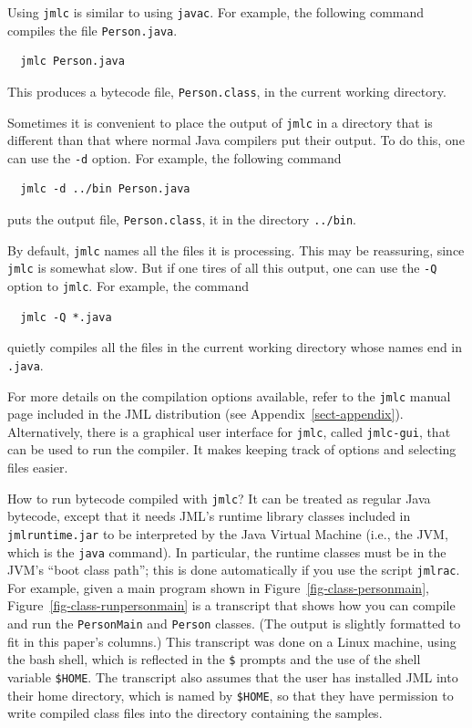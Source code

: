 \documentclass[twocolumn]{article}
\begin{document}
Using \texttt{jmlc} is similar to using \texttt{javac}.
For example, the following command compiles the file \texttt{Person.java}.
\begin{verbatim}
  jmlc Person.java
\end{verbatim}
This produces a bytecode file, \texttt{Person.class},
in the current working directory.

Sometimes it is convenient to place the output of \texttt{jmlc} in a
directory that is different than that where normal Java compilers put
their output.  To do this, one can use the \texttt{-d} option.
For example, the following command
\begin{verbatim}
  jmlc -d ../bin Person.java
\end{verbatim}
puts the output file, \texttt{Person.class}, it in the directory
\texttt{../bin}. 

By default, \texttt{jmlc} names all the files it is processing.  This
may be reassuring, since \texttt{jmlc} is somewhat slow.  But if one
tires of all this output, one can use the \texttt{-Q} option to
\texttt{jmlc}.  For example, the command
\begin{verbatim}
  jmlc -Q *.java
\end{verbatim}
quietly compiles all the files in the current working directory
whose names end in \texttt{.java}.

For more details on the compilation options available, refer to the
\texttt{jmlc} manual page included in the JML distribution (see
Appendix~\ref{sect-appendix}).
Alternatively, there is a graphical user interface for \texttt{jmlc},
called \texttt{jmlc-gui}, that can be used to run the compiler.  It
makes keeping track of options and selecting files easier.

How to run bytecode compiled with \texttt{jmlc}?  It can be treated as
regular Java bytecode, except that it needs JML's runtime library
classes included in \texttt{jmlruntime.jar} 
to be interpreted by the Java Virtual Machine (i.e., the JVM, which is
the \texttt{java} command). In
particular, the runtime classes must be in the JVM's
``boot class path'';
this is done automatically if you use the script \texttt{jmlrac}.  For
example, given a main program shown in
Figure~\ref{fig-class-personmain}, 
Figure~\ref{fig-class-runpersonmain} is a transcript that
shows how you can compile and run the \texttt{PersonMain} 
and \texttt{Person} classes.
(The output is slightly formatted to fit in this paper's columns.)
This transcript was done on a Linux machine, using the bash shell,
which is reflected in the \verb|$| %
prompts and the use of the shell variable \verb|$HOME|. %
The transcript also assumes that the user has installed JML into their
home directory, which is named by \verb|$HOME|, %
so that they have permission to write compiled class files into the
directory containing the samples.
\end{document}
